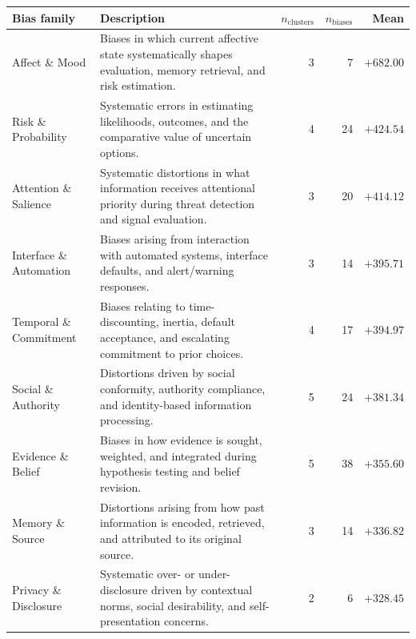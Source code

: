 \begin{tabular}{@{}p{}p{}rrr@{}}
\toprule
\footnotesize Bias family & \footnotesize Description & \footnotesize $n_{\mathrm{clusters}}$ & \footnotesize $n_{\mathrm{biases}}$ & \footnotesize Mean \ecbss{} \\
\midrule
\footnotesize Affect \& Mood & \footnotesize Biases in which current affective state systematically shapes evaluation, memory retrieval, and risk estimation. & \footnotesize 3 & \footnotesize 7 & \footnotesize $+682.00$ \\
\footnotesize Risk \& Probability & \footnotesize Systematic errors in estimating likelihoods, outcomes, and the comparative value of uncertain options. & \footnotesize 4 & \footnotesize 24 & \footnotesize $+424.54$ \\
\footnotesize Attention \& Salience & \footnotesize Systematic distortions in what information receives attentional priority during threat detection and signal evaluation. & \footnotesize 3 & \footnotesize 20 & \footnotesize $+414.12$ \\
\footnotesize Interface \& Automation & \footnotesize Biases arising from interaction with automated systems, interface defaults, and alert/warning responses. & \footnotesize 3 & \footnotesize 14 & \footnotesize $+395.71$ \\
\footnotesize Temporal \& Commitment & \footnotesize Biases relating to time-discounting, inertia, default acceptance, and escalating commitment to prior choices. & \footnotesize 4 & \footnotesize 17 & \footnotesize $+394.97$ \\
\footnotesize Social \& Authority & \footnotesize Distortions driven by social conformity, authority compliance, and identity-based information processing. & \footnotesize 5 & \footnotesize 24 & \footnotesize $+381.34$ \\
\footnotesize Evidence \& Belief & \footnotesize Biases in how evidence is sought, weighted, and integrated during hypothesis testing and belief revision. & \footnotesize 5 & \footnotesize 38 & \footnotesize $+355.60$ \\
\footnotesize Memory \& Source & \footnotesize Distortions arising from how past information is encoded, retrieved, and attributed to its original source. & \footnotesize 3 & \footnotesize 14 & \footnotesize $+336.82$ \\
\footnotesize Privacy \& Disclosure & \footnotesize Systematic over- or under-disclosure driven by contextual norms, social desirability, and self-presentation concerns. & \footnotesize 2 & \footnotesize 6 & \footnotesize $+328.45$ \\

\end{tabular}
